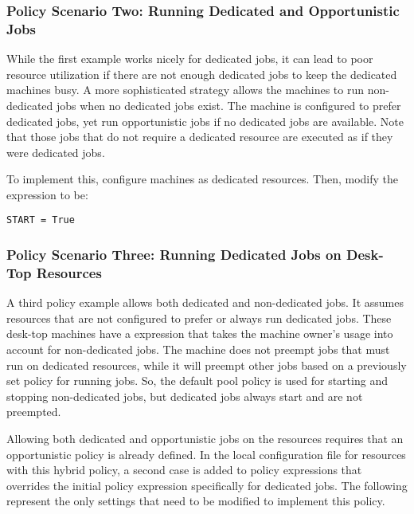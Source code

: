 \subsubsection{\label{sec:Configure-Dedicated-Opportunistic-Policy}
Policy Scenario Two: Running Dedicated and Opportunistic Jobs}

While the first example works nicely for dedicated jobs,
it can 
lead to poor resource utilization if there are not enough dedicated
jobs to keep the dedicated machines busy.  
A more sophisticated strategy allows 
the machines to run non-dedicated jobs when no dedicated jobs exist.
The machine is
configured to prefer dedicated jobs, yet
run opportunistic jobs if no dedicated jobs are available.
Note that those jobs that do not require a dedicated resource
are executed as if they were dedicated jobs.

To implement this,
configure machines as dedicated resources.
Then, modify the  expression to be:

\begin{verbatim}
START = True
\end{verbatim}

\subsubsection{\label{sec:Configure-Dedicated-Opportunistic-Policy}
Policy Scenario Three: Running Dedicated Jobs on Desk-Top Resources}

A third policy example allows both dedicated and non-dedicated
jobs.
It assumes resources that are not
configured to prefer or always run dedicated jobs.
These desk-top machines have a  expression that
takes the machine owner's usage into account for non-dedicated
jobs.
The machine does not preempt jobs that must run on dedicated
resources,
while it will preempt other jobs based on a previously set
policy for running jobs.
So, the default pool policy is used for starting and
stopping non-dedicated jobs, but dedicated jobs always start 
and are not preempted.

Allowing both dedicated and opportunistic jobs on the resources
requires that an opportunistic policy is already defined.
In the local configuration file for resources with this hybrid policy,
a second case is added to policy expressions that overrides
the initial policy expression specifically for
dedicated jobs.
The following represent the only settings that need to be modified
to implement this policy. 

